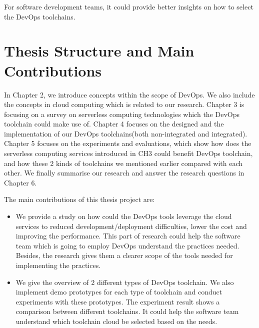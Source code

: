 For software development teams, it could provide better insights on how to select the DevOps toolchains.
\section{Thesis Structure and Main Contributions}
In Chapter 2, we introduce concepts within the scope of DevOps. We also include the concepts in cloud computing which is related to our research. Chapter 3 is focusing on a survey on serverless computing technologies which the DevOps toolchain could make use of. Chapter 4 focuses on the designed and the implementation of our DevOps toolchains(both non-integrated and integrated). Chapter 5 focuses on the experiments and evaluations, which show how does the serverless computing services introduced in CH3 could benefit DevOps toolchain, and how these 2 kinds of toolchains we mentioned earlier compared with each other. We finally summarise our research and answer the research questions in Chapter 6.
\par
The main contributions of this thesis project are:
\begin{itemize}
    \item We provide a study on how could the DevOps tools leverage the cloud services to reduced development/deployment difficulties, lower the cost and improving the performance. This part of research could help the software team which is going to employ DevOps understand the practices needed. Besides, the research gives them a clearer scope of the tools needed for implementing the practices.
    \item We give the overview of 2 different types of DevOps toolchain. We also implement demo prototypes for each type of toolchain and conduct experiments with these prototypes. The experiment result shows a comparison between different toolchains. It could help the software team understand which toolchain cloud be selected based on the needs.
\end{itemize}